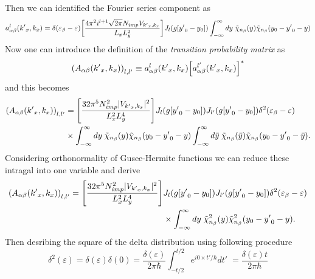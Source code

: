 Then we can identified the Fourier series component as
\begin{equation} \label{4.49}
    a^l_{\alpha\beta}({k'}_x,k_x) =
    \delta(\varepsilon_{\beta} - \varepsilon)
    \qty[\frac { 4\pi^2 i^{l+1} \sqrt{2\pi} N_{imp} V_{{k'}_x,k_x}}{L_x L_y^2}]
    J_l\qty(g[{y'}_0 - y_0])
    \int_{-\infty}^{\infty} dy \;
    \tilde{\chi}_{n_{\beta}}\qty(y)
    \tilde{\chi}_{n_{\beta}}\qty(y_0 - {y'}_0 - y)
\end{equation}
Now one can introduce the definition of the \textit{transition probability matrix} as
\begin{equation} \label{4.50}
    \qty(A_{\alpha\beta}({k'}_x,k_x))_{l,l'} \equiv
    a^l_{\alpha\beta}({k'}_x,k_x)\qty[a^{l'}_{\alpha\beta}({k'}_x,k_x)]^{*}
\end{equation}
and this becomes
\begin{equation} \label{4.51}
  \begin{aligned}
      \qty(A_{\alpha\beta}({k'}_x,k_x))_{l,l'} & =
      \qty[\frac { 32\pi^5 N_{imp}^2 |V_{{k'}_x,k_x}|^2}{L_x^2 L_y^4}]
      J_l\qty(g[{y'}_0 - y_0]) J_{l'}\qty(g[{y'}_0 - y_0])
      \delta^2(\varepsilon_{\beta} - \varepsilon) \\
      & \times
      \int_{-\infty}^{\infty} dy \;
      \tilde{\chi}_{n_{\beta}}\qty(y)
      \tilde{\chi}_{n_{\beta}}\qty(y_0 - {y'}_0 - y)
      \int_{-\infty}^{\infty} d\bar{y} \;
      \tilde{\chi}_{n_{\beta}}\qty(\bar{y})
      \tilde{\chi}_{n_{\beta}}\qty(y_0 - {y'}_0 - \bar{y}).
  \end{aligned}
\end{equation}
Considering orthonormality of Gusee-Hermite functions we can reduce these intragal into one variable and derive
\begin{equation} \label{4.52}
  \begin{aligned}
      \qty(A_{\alpha\beta}({k'}_x,k_x))_{l,l'} =
      \qty[\frac { 32\pi^5 N_{imp}^2 |V_{{k'}_x,k_x}|^2}{L_x^2 L_y^4}] &
      J_l\qty(g[{y'}_0 - y_0]) J_{l'}\qty(g[{y'}_0 - y_0])
      \delta^2(\varepsilon_{\beta} - \varepsilon) \\
      & \times
      \int_{-\infty}^{\infty} dy \;
      \tilde{\chi}^2_{n_{\beta}}\qty(y)
      \tilde{\chi}^2_{n_{\beta}}\qty(y_0 - {y'}_0 - y).
  \end{aligned}
\end{equation}
Then desribing the square of the delta distribution using following procedure
\begin{equation} \label{4.53}
    \delta^2(\varepsilon) =
    \delta(\varepsilon)\delta(0) =
    \frac{\delta(\varepsilon)}{2\pi \hbar}
    \int_{-t/2}^{t/2} e^{i0\times t'/\hbar} dt'\; =
    \frac{\delta(\varepsilon)t}{2\pi \hbar}
\end{equation}
